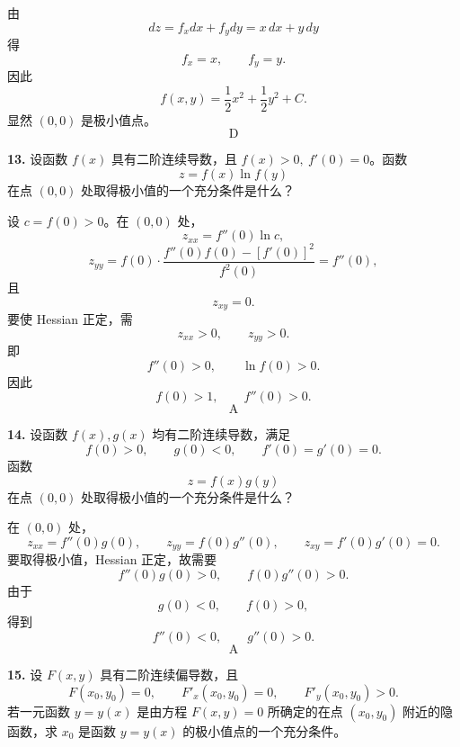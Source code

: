 \begin{solutionblock}
由
\[
dz=f_xdx+f_ydy=x\,dx+y\,dy
\]
得
\[
f_x=x,\qquad f_y=y.
\]
因此
\[
f(x,y)=\frac12x^2+\frac12y^2+C.
\]
显然 \((0,0)\) 是极小值点。
\[
\boxed{\text{D}}
\]
\end{solutionblock}

\begin{problemblock}
\textbf{13.} 设函数 \(f(x)\) 具有二阶连续导数，且 \(f(x)>0,\ f'(0)=0\)。函数
\[
z=f(x)\ln f(y)
\]
在点 \((0,0)\) 处取得极小值的一个充分条件是什么？
\end{problemblock}

\begin{solutionblock}
设 \(c=f(0)>0\)。在 \((0,0)\) 处，
\[
z_{xx}=f''(0)\ln c,
\]
\[
z_{yy}=f(0)\cdot \frac{f''(0)f(0)-[f'(0)]^2}{f^2(0)}
=f''(0),
\]
且
\[
z_{xy}=0.
\]
要使 Hessian 正定，需
\[
z_{xx}>0,\qquad z_{yy}>0.
\]
即
\[
f''(0)>0,\qquad \ln f(0)>0.
\]
因此
\[
f(0)>1,\qquad f''(0)>0.
\]
\[
\boxed{\text{A}}
\]
\end{solutionblock}

\begin{problemblock}
\textbf{14.} 设函数 \(f(x),g(x)\) 均有二阶连续导数，满足
\[
f(0)>0,\qquad g(0)<0,\qquad f'(0)=g'(0)=0.
\]
函数
\[
z=f(x)g(y)
\]
在点 \((0,0)\) 处取得极小值的一个充分条件是什么？
\end{problemblock}

\begin{solutionblock}
在 \((0,0)\) 处，
\[
z_{xx}=f''(0)g(0),\qquad
z_{yy}=f(0)g''(0),\qquad
z_{xy}=f'(0)g'(0)=0.
\]
要取得极小值，Hessian 正定，故需要
\[
f''(0)g(0)>0,\qquad f(0)g''(0)>0.
\]
由于
\[
g(0)<0,\qquad f(0)>0,
\]
得到
\[
f''(0)<0,\qquad g''(0)>0.
\]
\[
\boxed{\text{A}}
\]
\end{solutionblock}

\begin{problemblock}
\textbf{15.} 设 \(F(x,y)\) 具有二阶连续偏导数，且
\[
F(x_0,y_0)=0,\qquad F'_x(x_0,y_0)=0,\qquad F'_y(x_0,y_0)>0.
\]
若一元函数 \(y=y(x)\) 是由方程 \(F(x,y)=0\) 所确定的在点 \((x_0,y_0)\) 附近的隐函数，求 \(x_0\) 是函数 \(y=y(x)\) 的极小值点的一个充分条件。
\end{problemblock}

